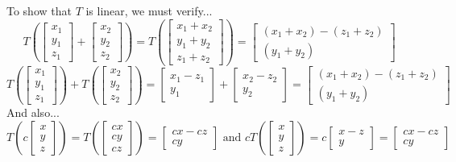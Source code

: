 \begin{applicationActivities}{1}{17}
\begin{example}
\pause To show that \(T\) is linear, we must verify...
\[
  T\left(
    \begin{bmatrix} x_1 \\ y_1 \\ z_1 \end{bmatrix} +
    \begin{bmatrix}x_2 \\ y_2  \\ z_2 \end{bmatrix}
  \right)
=
  T\left(
    \begin{bmatrix} x_1+x_2 \\ y_1+y_2 \\ z_1+z_2 \end{bmatrix}
  \right) =
  \begin{bmatrix} (x_1+x_2)-(z_1+z_2) \\ (y_1+y_2) \end{bmatrix}
\]
\[
  T\left(
    \begin{bmatrix} x_1 \\ y_1 \\ z_1 \end{bmatrix}
  \right) + T\left(
    \begin{bmatrix} x_2 \\ y_2 \\ z_2 \end{bmatrix}
  \right)
=
  \begin{bmatrix} x_1-z_1 \\ y_1 \end{bmatrix} +
  \begin{bmatrix} x_2-z_2 \\ y_2 \end{bmatrix}=
  \begin{bmatrix} (x_1+x_2)-(z_1+z_2) \\ (y_1+y_2) \end{bmatrix}
\]
\pause
And also...
\[
  T\left(c\begin{bmatrix} x \\ y \\ z \end{bmatrix} \right)
=
  T\left(\begin{bmatrix} cx \\ cy \\ cz \end{bmatrix} \right)
=
  \begin{bmatrix} cx-cz \\ cy \end{bmatrix}
\text{ and }
  cT\left(\begin{bmatrix} x \\ y \\ z \end{bmatrix} \right)
=
  c\begin{bmatrix} x-z \\ y \end{bmatrix}
=
  \begin{bmatrix} cx-cz \\ cy \end{bmatrix}
\]


\end{example}
\end{applicationActivities}
